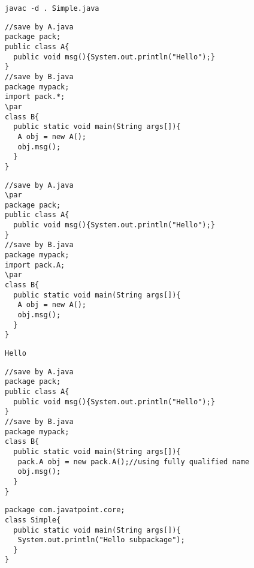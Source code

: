 \documentclass{book}
\def\lthtmlcheckvsize{\ifdim\ht\sizebox<\vsize 
  \ifdim\wd\sizebox<\hsize\expandafter\hfill\fi \expandafter\vfill
  \else\expandafter\vss\fi}%
\begin{document}
{\newpage\clearpage
{}%
\begin{lstlisting}
javac -d . Simple.java  
\end{lstlisting}%
\lthtmlfigureZ
\lthtmlcheckvsize\clearpage}

{\newpage\clearpage
{}%
\begin{lstlisting}
//save by A.java  
package pack;  
public class A{  
  public void msg(){System.out.println("Hello");}  
}  
//save by B.java  
package mypack;  
import pack.*;  
\par
class B{  
  public static void main(String args[]){  
   A obj = new A();  
   obj.msg();  
  }  
}  
\end{lstlisting}%
\lthtmlfigureZ
\lthtmlcheckvsize\clearpage}

{\newpage\clearpage
{}%
\begin{lstlisting}
//save by A.java  
\par
package pack;  
public class A{  
  public void msg(){System.out.println("Hello");}  
}  
//save by B.java  
package mypack;  
import pack.A;  
\par
class B{  
  public static void main(String args[]){  
   A obj = new A();  
   obj.msg();  
  }  
}  
\end{lstlisting}%
\lthtmlfigureZ
\lthtmlcheckvsize\clearpage}

{\newpage\clearpage
{}%
\begin{lstlisting}
Hello
\end{lstlisting}%
\lthtmlfigureZ
\lthtmlcheckvsize\clearpage}

{\newpage\clearpage
{}%
\begin{lstlisting}
//save by A.java  
package pack;  
public class A{  
  public void msg(){System.out.println("Hello");}  
}  
//save by B.java  
package mypack;  
class B{  
  public static void main(String args[]){  
   pack.A obj = new pack.A();//using fully qualified name  
   obj.msg();  
  }  
}  
\end{lstlisting}%
\lthtmlfigureZ
\lthtmlcheckvsize\clearpage}

{\newpage\clearpage
{}%
\begin{lstlisting}
package com.javatpoint.core;  
class Simple{  
  public static void main(String args[]){  
   System.out.println("Hello subpackage");  
  }  
}  
\end{lstlisting}%
\lthtmlfigureZ
\lthtmlcheckvsize\clearpage}
\end{document}
